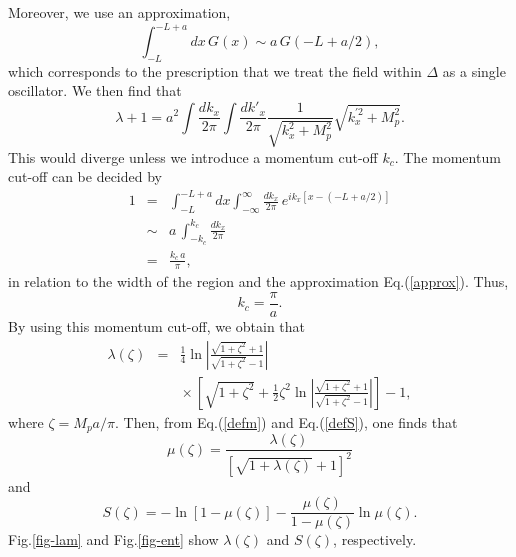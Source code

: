Moreover, we use an approximation,
\begin{equation}
  \int^{-L+a}_{-L} dx\, G(x) \sim a\,G(-L+a/2),
\label{approx}
\end{equation}
which corresponds to the prescription that we treat the field
within $\Delta$ as a single oscillator.
We then find that
\begin{equation}
 \lambda+1= a^2 \int \frac{dk_x}{2\pi}\int \frac{dk'_x}{2\pi}
   \frac{1}{\sqrt{k_x^2+M_p^2}}\sqrt{k_x^{'2}+M_p^2}.
\end{equation}
This would diverge unless we introduce a momentum cut-off $k_c$.
The momentum cut-off can be decided by
\begin{eqnarray}
 1&=&\int^{-L+a}_{-L}dx \int^\infty_{-\infty} \frac{dk_x}{2\pi}
   \,e^{ik_x[x-(-L+a/2)]} \nonumber \\
  &\sim & a\,\int^{k_c}_{-k_c} \frac{dk_x}{2\pi} \nonumber \\
  &=& \frac{k_c\,a}{\pi},
\label{cutoff}
\end{eqnarray}
in relation to the width of the region
and the approximation Eq.(\ref{approx}).
Thus, 
\begin{equation}
k_c=\frac{\pi}{a}.
\end{equation}
By using this momentum cut-off, we obtain that
\begin{eqnarray}
  \lambda(\zeta) &=&\frac{1}{4}
  \ln\left|\frac{\sqrt{1+\zeta^2}+1}{\sqrt{1+\zeta^2}-1}\right|
  \nonumber \\
   & & {}\times
  \left[\sqrt{1+\zeta^2}+\frac{1}{2}\zeta^2
 \ln\left|\frac{\sqrt{1+\zeta^2}+1}{\sqrt{1+\zeta^2}-1}\right|
 \right]-1,
\end{eqnarray}
where $\zeta=M_pa/\pi$.
Then, from Eq.(\ref{defm}) and Eq.(\ref{defS}),
one finds that
\begin{equation}
  \mu(\zeta) = \frac{\lambda(\zeta)}
      {\left[\sqrt{1+\lambda(\zeta)}+1\right]^2}
\end{equation}
and
\begin{equation}
  S(\zeta)=-\ln[1-\mu(\zeta)]
    -\frac{\mu(\zeta)}{1-\mu(\zeta)}\ln\mu(\zeta).
\end{equation}
Fig.\ref{fig-lam} and Fig.\ref{fig-ent}
show $\lambda(\zeta)$ and $S(\zeta)$,
respectively.

